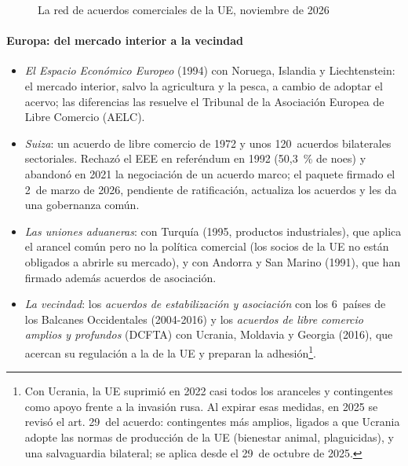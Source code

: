 \documentclass[11pt]{article}
\begin{document}
\begin{figure}[H]
\centering
\caption{La red de acuerdos comerciales de la UE, noviembre de 2026}\label{fig:mapa-acuerdos}
\end{figure}

\paragraph{Europa: del mercado interior a la vecindad}

\begin{itemize}
\item \emph{El Espacio Económico Europeo} (1994) con Noruega, Islandia y Liechtenstein: el mercado interior, salvo la agricultura y la pesca, a cambio de adoptar el acervo; las diferencias las resuelve el Tribunal de la Asociación Europea de Libre Comercio (AELC).
\item \emph{Suiza}: un acuerdo de libre comercio de 1972 y unos 120~acuerdos bilaterales sectoriales. Rechazó el EEE en referéndum en 1992 (50,3~\% de noes) y abandonó en 2021 la negociación de un acuerdo marco; el paquete firmado el 2~de marzo de 2026, pendiente de ratificación, actualiza los acuerdos y les da una gobernanza común\nocite{CE2026Suiza}.
\item \emph{Las uniones aduaneras}: con Turquía (1995, productos industriales), que aplica el arancel común pero no la política comercial (los socios de la UE no están obligados a abrirle su mercado), y con Andorra y San Marino (1991), que han firmado además acuerdos de asociación.
\item \emph{La vecindad}: los \emph{acuerdos de estabilización y asociación} con los 6~países de los Balcanes Occidentales (2004-2016) y los \emph{acuerdos de libre comercio amplios y profundos} (DCFTA) con Ucrania, Moldavia y Georgia (2016), que acercan su regulación a la de la UE y preparan la adhesión\footnote{Con Ucrania, la UE suprimió en 2022 casi todos los aranceles y contingentes como apoyo frente a la invasión rusa. Al expirar esas medidas, en 2025 se revisó el art. 29~del acuerdo: contingentes más amplios, ligados a que Ucrania adopte las normas de producción de la UE (bienestar animal, plaguicidas), y una salvaguardia bilateral; se aplica desde el 29~de octubre de 2025\nocite{CE2026Ucrania}.}.
\end{itemize}
\end{document}
